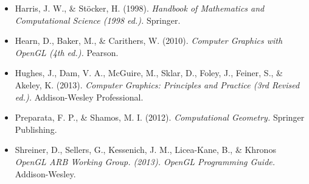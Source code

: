 \documentclass[12pt,a4paper]{article}
\begin{document}
\begin{itemize}
\item Harris, J. W., \& Stöcker, H. (1998). \textit{Handbook of Mathematics and Computational Science (1998 ed.). } Springer.

\item Hearn, D., Baker, M., \& Carithers, W. (2010).  \textit{Computer Graphics with OpenGL (4th ed.).} Pearson.

\item Hughes, J., Dam, V. A., McGuire, M., Sklar, D., Foley, J., Feiner, S., \& Akeley, K. (2013). \textit{Computer Graphics: Principles and Practice (3rd Revised ed.).} Addison-Wesley Professional.

\item Preparata, F. P., \& Shamos, M. I. (2012). \textit{Computational Geometry.} Springer Publishing.

\item Shreiner, D., Sellers, G., Kessenich, J. M., Licea-Kane, B., \& Khronos \textit{OpenGL ARB Working Group. (2013).  OpenGL Programming Guide. } Addison-Wesley.
\end{itemize}
\end{document}
